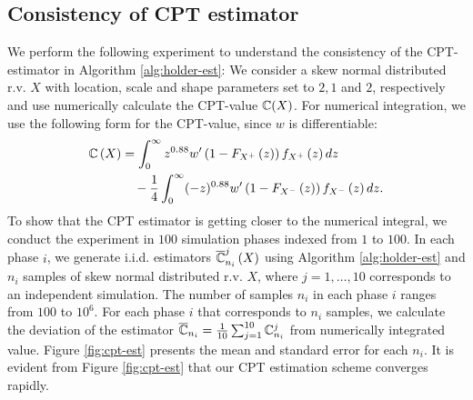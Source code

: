 \subsection{Consistency of CPT estimator}
We perform the following experiment to understand the consistency of the CPT-estimator in Algorithm \ref{alg:holder-est}:
We consider a skew normal distributed  r.v. $X$ with location, scale and shape parameters set to $2,1$ and $2$, respectively and use 
numerically calculate the CPT-value $\mathbb{C}(X)$. 
For numerical integration, we use the following form for the CPT-value, since $w$ is differentiable:
\begin{align*}
\mathbb{C}\left( X \right) & = \int_0^{\infty} z^{0.88} w^\prime \left(1 - F_{X^+}\left(z\right)\right) f_{X^+}\left(z\right)dz \\
&\quad - \frac1{4} \int_0^{\infty} (-z)^{0.88} w^\prime \left(1 - F_{X^-}\left(z\right)\right) f_{X^-}\left(z\right) dz.
\end{align*}
To show that the CPT estimator is getting closer to the numerical integral, 
we conduct the experiment in $100$ simulation phases indexed from $1$ to $100$. In each phase $i$, we generate i.i.d. estimators $\overline{\mathbb{C}}^j_{n_i}\left(X\right)$ using Algorithm \ref{alg:holder-est} and $n_i$ samples of skew normal distributed r.v. $X$, where $j=1,\ldots,10$ corresponds to an independent simulation. The number of samples $n_i$ in each phase $i$ ranges from $100$ to $10^6$. For each phase $i$ that corresponds to $n_i$ samples, we calculate the deviation of the estimator $\overline {\mathbb{C}}_{n_i} = \frac1{10}\sum_{j=1}^{10}\mathbb{C}^j_{n_i}$ from numerically integrated value. Figure \ref{fig:cpt-est} presents the mean and standard error for each $n_i$. 
It is evident from Figure \ref{fig:cpt-est} that our CPT estimation scheme converges rapidly.

\newcommand{\errorband}[5][]{ %
\pgfplotstableread[col sep=tab, skip first n=2]{#2}\datatable
    \addplot [draw=none, stack plots=y, forget plot] table [
        x={#3},
        y expr=\thisrow{#4}-2*\thisrow{#5}
    ] {\datatable};

    \addplot [draw=none, fill=gray!40, stack plots=y, area legend, #1] table [
        x={#3},
        y expr=4*\thisrow{#5}
    ] {\datatable} \closedcycle;

    \addplot [forget plot, stack plots=y,draw=none] table [x={#3}, y expr=-(\thisrow{#4}+2*\thisrow{#5})] {\datatable};
}

